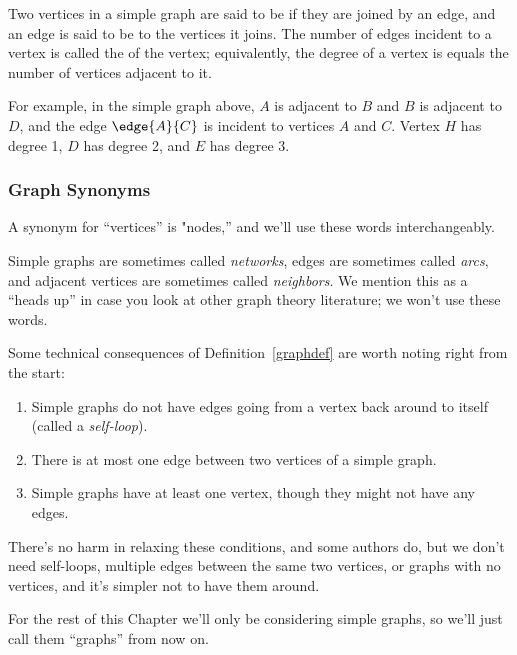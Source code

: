 \begin{definition}
Two vertices in a simple graph are said to be  if they are
joined by an edge, and an edge is said to be  to the
vertices it joins.  The number of edges incident to a vertex is called the
 of the vertex; equivalently, the degree of a vertex is
equals the number of vertices adjacent to it.
\end{definition}

For example, in the simple graph above, $A$ is adjacent to $B$ and $B$ is
adjacent to $D$, and the edge $\edge{A}{C}$ is incident to vertices $A$
and $C$.  Vertex $H$ has degree 1, $D$ has degree 2, and $E$ has degree 3.

\subsubsection{Graph Synonyms}

A synonym for ``vertices'' is "nodes,'' and we'll use these words
interchangeably.

Simple graphs are sometimes called \emph{networks}, edges are sometimes
called \emph{arcs}, and adjacent vertices are sometimes called
\emph{neighbors}.  We mention this as a ``heads up'' in case you look at
other graph theory literature; we won't use these words.

Some technical consequences of Definition~\ref{graphdef} are worth noting
right from the start:
\begin{enumerate}
\item Simple graphs do not have edges going from a vertex
back around to itself (called a \emph{self-loop}).

\item There is at most one edge between two vertices of a simple graph.

\item Simple graphs have at least one vertex, though they might not have
any edges.
\end{enumerate}
There's no harm in relaxing these conditions, and some authors do, but we
don't need self-loops, multiple edges between the same two vertices, or
graphs with no vertices, and it's simpler not to have them around.

For the rest of this Chapter we'll only be considering simple graphs, so
we'll just call them ``graphs'' from now on.


